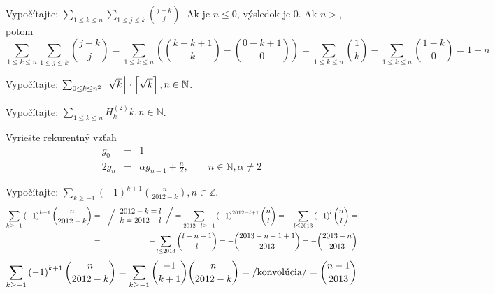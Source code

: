 \pr Vypočítajte:  $\sum_{1\leq k\leq n} \sum_{1\leq j\leq k}{j-k \choose j}$.
 Ak je $n\leq 0$, výsledok je $0$. Ak $n>$, potom
$$
\sum_{1\leq k\leq n} \sum_{1\leq j\leq k}{j-k \choose j} = \sum_{1\leq k\leq n} \left( {k - k + 1 \choose k} - {0 - k + 1 \choose 0}\right) = \sum_{1\leq k\leq n} {1 \choose k} - \sum_{1\leq k\leq n}{1-k \choose 0} = 1 -n
$$

\pr Vypočítajte: $\sum_{0\leq k \leq n^2} \left\lfloor \sqrt k \right\rfloor \cdot \left\lceil \sqrt k \right\rceil, n\in\mathbb{N}$.

\pr Vypočítajte: $\sum_{1\leq k \leq n} H_k^{\left(2\right)}k, n\in\mathbb{N}$.

\pr Vyriešte rekurentný vzťah
\begin{eqnarray*}
g_0 &=& 1\\
2g_n &=& \alpha g_{n-1} + \frac{n}2,\qquad n\in\mathbb{N}, \alpha \ne 2
\end{eqnarray*}

\pr Vypočítajte: $\sum_{k\geq -1} \left(-1\right)^{k+1}{n \choose 2012 - k}, n\in\mathbb{Z}$.
\begin{eqnarray*}
\sum_{k\geq -1} \left(-1\right)^{k+1}{n \choose 2012 - k} &=& \left/
\begin{array}{l}
2012 - k = l\\
k = 2012 - l
\end{array}
\right/ = \sum_{2012-l\geq -1}\left(-1\right)^{2012 - l + 1}{n \choose l} = -\sum_{l\leq 2013} \left(-1\right)^l{n \choose l} =\\
 &=& -\sum_{l\leq 2013}{l - n - 1 \choose l} = -{2013 - n - 1 + 1 \choose 2013} = -{2013 - n\choose 2013}
\end{eqnarray*}
$$
\sum_{k\geq -1} \left(-1\right)^{k+1}{n \choose 2012 - k} = \sum_{k\geq -1} {-1 \choose k+1}{n \choose 2012 - k} = \left/ \hbox{konvolúcia}\right/ = {n-1 \choose 2013}
$$
